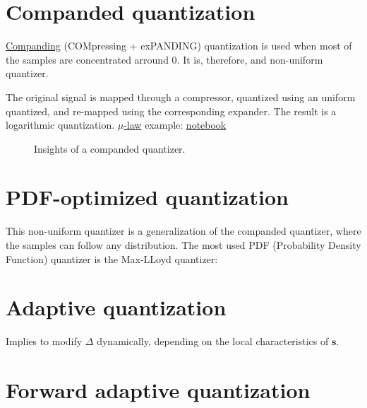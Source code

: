 
\section{Companded quantization~\cite{sayood2017introduction}}

\href{https://en.wikipedia.org/wiki/Companding}{Companding}
(COMpressing + exPANDING) quantization is used when most of the
samples are concentrated arround 0. It is, therefore, and non-uniform
quantizer.

The original signal is mapped through a compressor, quantized using an
uniform quantized, and re-mapped using the corresponding expander. The
result is a logarithmic quantization.
\href{https://en.wikipedia.org/wiki/\%CE\%9C-law_algorithm}{\(\mu\)-law}
example:
\href{https://nbviewer.jupyter.org/github/vicente-gonzalez-ruiz/quantization/blob/master/graphics/companded_quantization.ipynb}{notebook}

\begin{figure}
  \caption{Insights of a companded quantizer.}
  \label{fig:companded_quantizer}
\end{figure}


\section{PDF-optimized quantization}

This non-uniform quantizer is a generalization of the companded
quantizer, where the samples can follow any distribution. The most
used PDF (Probability Density Function) quantizer is the Max-LLoyd
quantizer:



\section{Adaptive quantization}

Implies to modify $\Delta$ dynamically, depending on the local characteristics of ${\mathbf s}$.


\section{Forward adaptive quantization}

